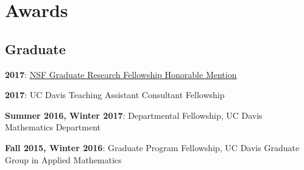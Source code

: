 \documentclass[letterpaper]{deedy-resume} %
\begin{document}
\begin{minipage}[t]{0.33\textwidth}
\section{Awards}
\subsection{Graduate}
\vspace{\topsep}
\begin{tightitemize}
    \item \textbf{2017}: \setmainfont[Path = fonts/lato/,BoldItalicFont=Lato-RegIta,BoldFont=Lato-Reg,ItalicFont=Lato-LigIta]{Lato-Lig}\href{https://www.fastlane.nsf.gov/grfp/AwardeeList.do?method=loadAwardeeList}{NSF Graduate Research Fellowship Honorable Mention}\setmainfont[Color=primary, Path = fonts/lato/]{Lato-Lig}
\end{tightitemize}\vspace{-3pt}
\begin{tightitemize}
    \item \textbf{2017}: UC Davis Teaching Assistant Consultant Fellowship
\end{tightitemize}
\begin{tightitemize}
    \item \textbf{Summer 2016, Winter 2017}: Departmental Fellowship, UC Davis Mathematics Department
    \item \textbf{Fall 2015, Winter 2016}: Graduate Program Fellowship, UC Davis Graduate Group in Applied Mathematics
\end{tightitemize}
\vspace{5pt}

\end{minipage}
\end{document}
